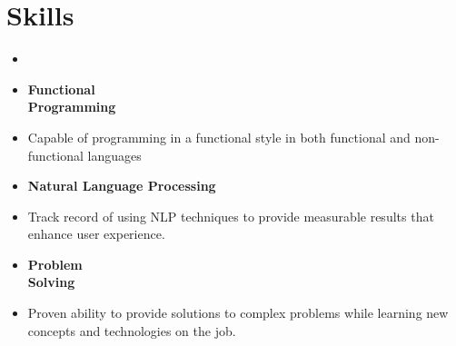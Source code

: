 \documentclass[11pt,a4paper,sans]{moderncv} %
\begin{document}
\section{Skills}
\begin{minipage}[t]{0.13\textwidth}
    \begin{itemize}
        \item[] 
    \end{itemize}
\end{minipage}
\begin{minipage}[t]{0.29\textwidth}
    \begin{itemize}
        \item[] \begin{center} \textbf{Functional \\ Programming} \end{center}
        \item[] \small Capable of programming in a functional style in both functional and non-functional languages
    \end{itemize}
\end{minipage}
\begin{minipage}[t]{0.29\textwidth}
    \begin{itemize}
        \item[] \begin{center} \textbf{Natural Language Processing} \end{center}      
        \item[] \small Track record of using NLP techniques to provide measurable results that enhance user experience.
    \end{itemize}
\end{minipage}
\begin{minipage}[t]{0.29\textwidth}
    \begin{itemize}
        \item[] \begin{center} \textbf{Problem \\ Solving} \end{center}
        \item[] \small Proven ability to provide solutions to complex problems while learning new concepts and technologies on the job.
    \end{itemize}
\end{minipage}

\end{document}
